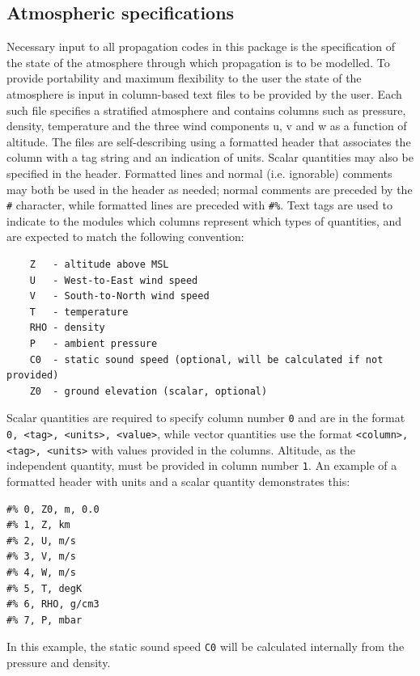 \subsection{Atmospheric specifications}
\label{sec: AtmoSpecs}
Necessary input to all propagation codes in this package is the specification of the state of the atmosphere through which propagation is to be modelled. To provide portability and maximum flexibility to the user the state of the atmosphere is input in column-based text files to be provided by the user. Each such file specifies a stratified atmosphere and contains columns such as pressure, density, temperature and the three wind components u, v and w as a function of altitude. The files are self-describing using a formatted header that associates the column with a tag string and an indication of units.  Scalar quantities may also be specified in the header.  Formatted lines and normal (i.e. ignorable) comments may both be used in the header as needed; normal comments are preceded by the \verb"#" character, while formatted lines are preceded with \verb"#%".  Text tags are used to indicate to the modules which columns represent which types of quantities, and are expected to match the following convention:
\begin{verbatim}
    Z   - altitude above MSL
    U   - West-to-East wind speed
    V   - South-to-North wind speed
    T   - temperature
    RHO - density
    P   - ambient pressure
    C0  - static sound speed (optional, will be calculated if not provided)
    Z0  - ground elevation (scalar, optional)
\end{verbatim}

Scalar quantities are required to specify column number \verb"0" and are in the format \verb"0, <tag>, <units>, <value>", while vector quantities use the format \verb"<column>, <tag>, <units>" with values provided in the columns.  Altitude, as the independent quantity, must be provided in column number \verb"1".  An example of a formatted header with units and a scalar quantity demonstrates this:
\begin{verbatim}
#% 0, Z0, m, 0.0
#% 1, Z, km
#% 2, U, m/s
#% 3, V, m/s
#% 4, W, m/s
#% 5, T, degK
#% 6, RHO, g/cm3
#% 7, P, mbar
\end{verbatim}
In this example, the static sound speed \verb"C0" will be calculated internally from the pressure and density.

